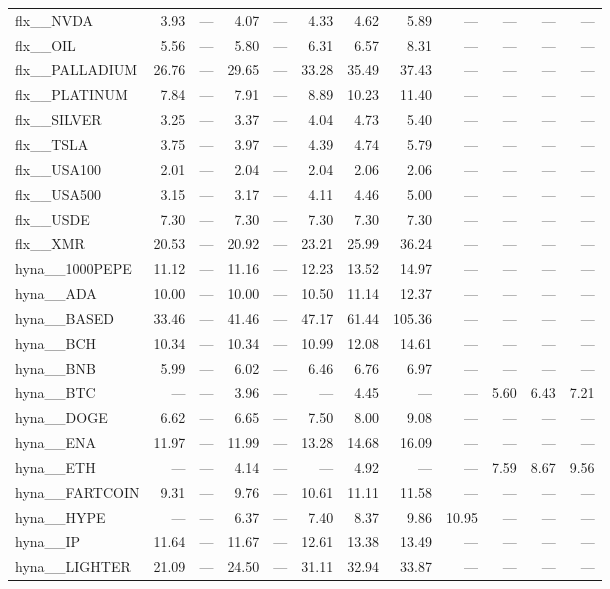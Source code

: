 \begin{table}[h]
\begin{tabular}{lrrrrrrrrrrr}
flx__NVDA & 3.93 & — & 4.07 & — & 4.33 & 4.62 & 5.89 & — & — & — & — \\
flx__OIL & 5.56 & — & 5.80 & — & 6.31 & 6.57 & 8.31 & — & — & — & — \\
flx__PALLADIUM & 26.76 & — & 29.65 & — & 33.28 & 35.49 & 37.43 & — & — & — & — \\
flx__PLATINUM & 7.84 & — & 7.91 & — & 8.89 & 10.23 & 11.40 & — & — & — & — \\
flx__SILVER & 3.25 & — & 3.37 & — & 4.04 & 4.73 & 5.40 & — & — & — & — \\
flx__TSLA & 3.75 & — & 3.97 & — & 4.39 & 4.74 & 5.79 & — & — & — & — \\
flx__USA100 & 2.01 & — & 2.04 & — & 2.04 & 2.06 & 2.06 & — & — & — & — \\
flx__USA500 & 3.15 & — & 3.17 & — & 4.11 & 4.46 & 5.00 & — & — & — & — \\
flx__USDE & 7.30 & — & 7.30 & — & 7.30 & 7.30 & 7.30 & — & — & — & — \\
flx__XMR & 20.53 & — & 20.92 & — & 23.21 & 25.99 & 36.24 & — & — & — & — \\
hyna__1000PEPE & 11.12 & — & 11.16 & — & 12.23 & 13.52 & 14.97 & — & — & — & — \\
hyna__ADA & 10.00 & — & 10.00 & — & 10.50 & 11.14 & 12.37 & — & — & — & — \\
hyna__BASED & 33.46 & — & 41.46 & — & 47.17 & 61.44 & 105.36 & — & — & — & — \\
hyna__BCH & 10.34 & — & 10.34 & — & 10.99 & 12.08 & 14.61 & — & — & — & — \\
hyna__BNB & 5.99 & — & 6.02 & — & 6.46 & 6.76 & 6.97 & — & — & — & — \\
hyna__BTC & — & — & 3.96 & — & — & 4.45 & — & — & 5.60 & 6.43 & 7.21 \\
hyna__DOGE & 6.62 & — & 6.65 & — & 7.50 & 8.00 & 9.08 & — & — & — & — \\
hyna__ENA & 11.97 & — & 11.99 & — & 13.28 & 14.68 & 16.09 & — & — & — & — \\
hyna__ETH & — & — & 4.14 & — & — & 4.92 & — & — & 7.59 & 8.67 & 9.56 \\
hyna__FARTCOIN & 9.31 & — & 9.76 & — & 10.61 & 11.11 & 11.58 & — & — & — & — \\
hyna__HYPE & — & — & 6.37 & — & 7.40 & 8.37 & 9.86 & 10.95 & — & — & — \\
hyna__IP & 11.64 & — & 11.67 & — & 12.61 & 13.38 & 13.49 & — & — & — & — \\
hyna__LIGHTER & 21.09 & — & 24.50 & — & 31.11 & 32.94 & 33.87 & — & — & — & — \\

\end{tabular}
\end{table}
